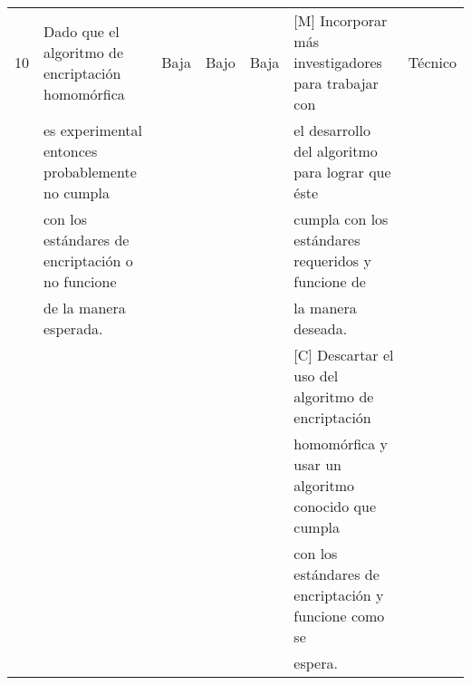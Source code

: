 \begin{landscape}
\begin{table}
\begin{tabular}{| l | l | l | l | l | l | l | }
10 & Dado que el algoritmo de encriptación homomórfica & Baja & Bajo & Baja & [M] Incorporar más investigadores para trabajar con & Técnico\\
  & es experimental entonces probablemente no cumpla  & & & &		el desarrollo del algoritmo para lograr que éste & \\
  & con los estándares de encriptación o no funcione  & & & &		cumpla con los estándares requeridos y funcione de & \\
  & de la manera esperada. 							  & & & & 		la manera deseada. & \\ 
  &&&&																&[C] Descartar el uso del algoritmo de encriptación & \\ 		  &&&&																& homomórfica y usar un algoritmo conocido que cumpla & \\
  &&&&																& con los estándares de encriptación y funcione como se & \\
  &&&&																& espera. &\\ \hline

     \hline
\end{tabular}
\end{table}
\end{landscape}
